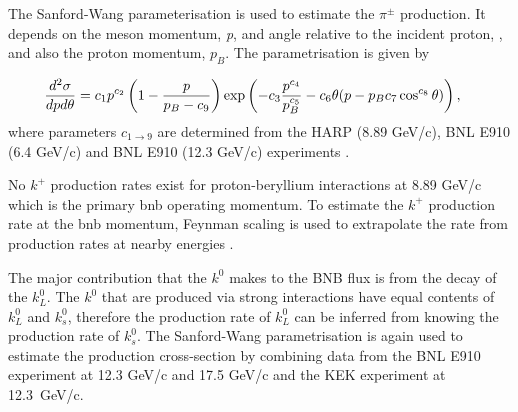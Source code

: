 The Sanford-Wang parameterisation is used to estimate the $\pi^{\pm}$ production. It depends on the meson momentum, \textit{p}, and angle relative to the incident proton, \textit{\theta}, and also the proton momentum, $p_B$. The parametrisation is given by

\begin{equation}
  \hspace{-0.35cm}
  \label{eq:SW}
  \frac{d^{2}\sigma}{dpd\theta} = 
  c_{1}p^{c_{2}} 
  \left( 1 - \frac{p}{p_{B} -c_{9}} \right)
  \exp \left( -c_{3} \frac{p^{c_{4}}}{p_{B}^{c_{5}}} - c_{6}\theta(p - p_{B}c_{7}\cos^{c_{8}}{\theta}) \right),
\end{equation}
where parameters $c_{1 \rightarrow 9}$ are determined from the HARP (8.89 GeV/c), BNL E910 (6.4 GeV/c) and BNL E910 (12.3 GeV/c) experiments \cite{BNB_flux}.

No $k^+$ production rates exist for proton-beryllium interactions at 8.89 GeV/c which is the primary \gls{bnb} operating momentum. To estimate the $k^+$ production rate at the \gls{bnb} momentum, Feynman scaling is used to extrapolate the rate from production rates at nearby energies \cite{BNB_flux}.

The major contribution that the $k^0$ makes to the BNB flux is from the decay of the $k^0_L$. The $k^0$ that are produced via strong interactions have equal contents of $k^0_L$ and $k^0_s$, therefore the production rate of $k^0_L$ can be inferred from knowing the production rate of $k^0_s$. The Sanford-Wang parametrisation is again used to estimate the production cross-section by combining data from the BNL E910 experiment at 12.3 GeV/c and 17.5 GeV/c and the KEK experiment at \mbox{12.3 GeV/c}.

